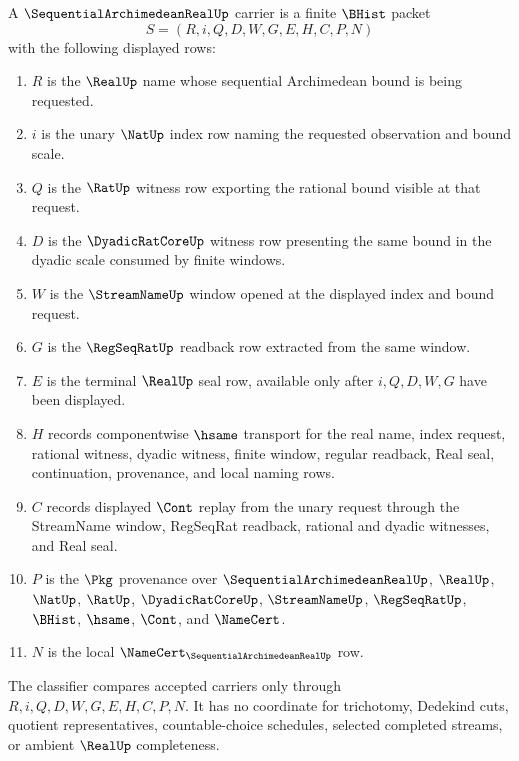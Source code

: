 \begin{definition}
\label{def:sequential-archimedean-real-carrier}
A $\SequentialArchimedeanRealUp$ carrier is a finite $\BHist$ packet
$$
S=(R,i,Q,D,W,G,E,H,C,P,N)
$$
with the following displayed rows:
\begin{enumerate}
\item $R$ is the $\RealUp$ name whose sequential Archimedean bound is being requested.
\item $i$ is the unary $\NatUp$ index row naming the requested observation and bound scale.
\item $Q$ is the $\RatUp$ witness row exporting the rational bound visible at that request.
\item $D$ is the $\DyadicRatCoreUp$ witness row presenting the same bound in the dyadic scale consumed by finite windows.
\item $W$ is the $\StreamNameUp$ window opened at the displayed index and bound request.
\item $G$ is the $\RegSeqRatUp$ readback row extracted from the same window.
\item $E$ is the terminal $\RealUp$ seal row, available only after $i,Q,D,W,G$ have been displayed.
\item $H$ records componentwise $\hsame$ transport for the real name, index request, rational witness, dyadic witness, finite window, regular readback, Real seal, continuation, provenance, and local naming rows.
\item $C$ records displayed $\Cont$ replay from the unary request through the StreamName window, RegSeqRat readback, rational and dyadic witnesses, and Real seal.
\item $P$ is the $\Pkg$ provenance over $\SequentialArchimedeanRealUp$, $\RealUp$, $\NatUp$, $\RatUp$, $\DyadicRatCoreUp$, $\StreamNameUp$, $\RegSeqRatUp$, $\BHist$, $\hsame$, $\Cont$, and $\NameCert$.
\item $N$ is the local $\NameCert_{\SequentialArchimedeanRealUp}$ row.
\end{enumerate}
The classifier compares accepted carriers only through $R,i,Q,D,W,G,E,H,C,P,N$. It has no coordinate for trichotomy, Dedekind cuts, quotient representatives, countable-choice schedules, selected completed streams, or ambient $\RealUp$ completeness.
\end{definition}

